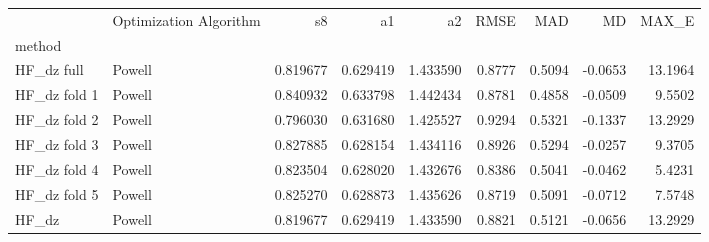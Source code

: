 \begin{tabular}{llrrrrrrr}
 & Optimization Algorithm & s8 & a1 & a2 & RMSE & MAD & MD & MAX_E \\
method &  &  &  &  &  &  &  &  \\
HF_dz full & Powell & 0.819677 & 0.629419 & 1.433590 & 0.8777 & 0.5094 & -0.0653 & 13.1964 \\
HF_dz fold 1 & Powell & 0.840932 & 0.633798 & 1.442434 & 0.8781 & 0.4858 & -0.0509 & 9.5502 \\
HF_dz fold 2 & Powell & 0.796030 & 0.631680 & 1.425527 & 0.9294 & 0.5321 & -0.1337 & 13.2929 \\
HF_dz fold 3 & Powell & 0.827885 & 0.628154 & 1.434116 & 0.8926 & 0.5294 & -0.0257 & 9.3705 \\
HF_dz fold 4 & Powell & 0.823504 & 0.628020 & 1.432676 & 0.8386 & 0.5041 & -0.0462 & 5.4231 \\
HF_dz fold 5 & Powell & 0.825270 & 0.628873 & 1.435626 & 0.8719 & 0.5091 & -0.0712 & 7.5748 \\
HF_dz & Powell & 0.819677 & 0.629419 & 1.433590 & 0.8821 & 0.5121 & -0.0656 & 13.2929 \\
\end{tabular}
